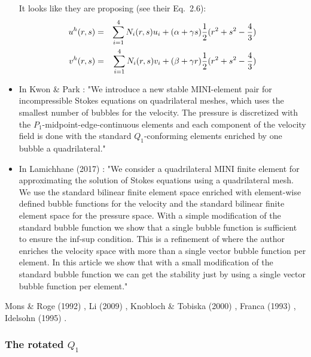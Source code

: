 \begin{itemize}
It looks like they are proposing (see their Eq.~2.6):
\begin{eqnarray}
u^h(r,s) &=& \sum_{i=1}^4 N_i (r,s) u_i + (\alpha + \gamma s)\frac{1}{2}(r^2+s^2-\frac43) \nonumber\\ 
v^h(r,s) &=& \sum_{i=1}^4 N_i (r,s) v_i + (\beta + \gamma r) \frac{1}{2}(r^2+s^2-\frac43)  
\end{eqnarray}

\item In Kwon \& Park \cite{kwpa14}: 
"We introduce a new stable MINI-element pair for incompressible Stokes equations on
quadrilateral meshes, which uses the smallest number of bubbles for the velocity. The pressure is 
discretized with the $P_1$-midpoint-edge-continuous elements and each component of the velocity field is
done with the standard $Q_1$-conforming elements enriched by one bubble a quadrilateral."

\item  In Lamichhane (2017) \cite{lami17}: "We consider a quadrilateral MINI
finite element for approximating the solution
of Stokes equations using a quadrilateral mesh. We use the standard bilinear finite
element space enriched with element-wise defined bubble functions for the velocity
and the standard bilinear finite element space for the pressure space. With a simple
modification of the standard bubble function we show that a single bubble function is
sufficient to ensure the inf-sup condition.
This is a refinement of \cite{bai97} where the author enriches the velocity space with
more than a single vector bubble function per element. In this article we show that 
with a small modification of the standard bubble function we can get the stability just 
by using a single vector bubble function per element."



\end{itemize}


\Literature Mons \& Roge (1992) \cite{moro92}, 
Li \etal (2009) \cite{lihc09}, Knobloch \& Tobiska (2000) \cite{knto00}, 
Franca \etal (1993) \cite{frha93}, Idelsohn \etal (1995) \cite{idsn95}.





\newpage
\subsubsection{The rotated $Q_1$} \label{ss:rq1}

